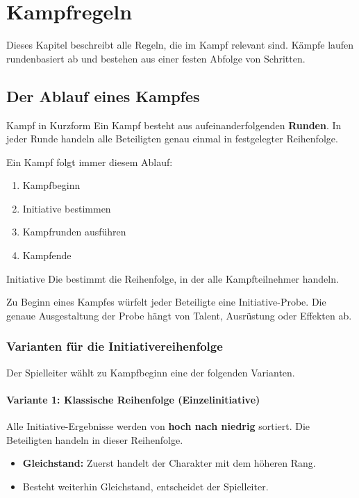 \chapter{Kampfregeln}

Dieses Kapitel beschreibt alle Regeln, die im Kampf relevant sind. Kämpfe laufen
rundenbasiert ab und bestehen aus einer festen Abfolge von Schritten.

\section{Der Ablauf eines Kampfes}

\begin{rulebox}{Kampf in Kurzform}
	Ein Kampf besteht aus aufeinanderfolgenden \textbf{Runden}.  
	In jeder Runde handeln alle Beteiligten genau einmal in festgelegter Reihenfolge.
\end{rulebox}

Ein Kampf folgt immer diesem Ablauf:
\begin{enumerate}
	\item Kampfbeginn
	\item Initiative bestimmen
	\item Kampfrunden ausführen
	\item Kampfende
\end{enumerate}

\begin{rulebox}{Initiative}
	Die  bestimmt die Reihenfolge, in der alle
	Kampfteilnehmer handeln.
\end{rulebox}

Zu Beginn eines Kampfes würfelt jeder Beteiligte eine Initiative-Probe.
Die genaue Ausgestaltung der Probe hängt von Talent, Ausrüstung oder Effekten ab.

\subsection*{Varianten für die Initiativereihenfolge}
Der Spielleiter wählt zu Kampfbeginn eine der folgenden Varianten.

\subsubsection*{Variante 1: Klassische Reihenfolge (Einzelinitiative)}
Alle Initiative-Ergebnisse werden von \textbf{hoch nach niedrig} sortiert.
Die Beteiligten handeln in dieser Reihenfolge.

\begin{itemize}
	\item \textbf{Gleichstand:} Zuerst handelt der Charakter mit dem höheren Rang.
	\item Besteht weiterhin Gleichstand, entscheidet der Spielleiter.
\end{itemize}

